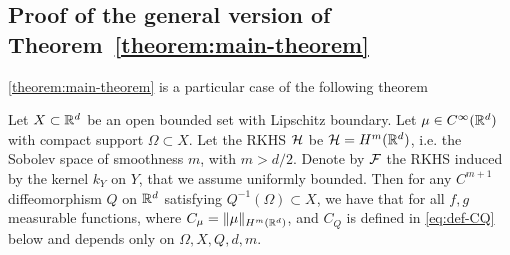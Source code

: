 \subsection{Proof of the general version of Theorem~\ref{theorem:main-theorem}}\label{sec:general-theorem}

\cref{theorem:main-theorem} is a particular case of the following theorem

\begin{theorem}\label{thm:general-theorem}
Let $X \subset \mathbb R^d$ be an open bounded set with Lipschitz boundary. Let $\mu \in C^\infty(\mathbb R^d)$ with compact support $\Omega \subset X$. Let the RKHS $\mathcal H$ be $\mathcal H = H^m(\mathbb R^d)$, i.e. the Sobolev space of smoothness $m$, with $m > d/2$. Denote by ${\cal F}$ the RKHS induced by the kernel $k_Y$ on $Y$, that we assume uniformly bounded. Then for any $C^{m+1}$ diffeomorphism $Q$ on $\mathbb R^d$ satisfying $Q^{-1}(\Omega) \subset X$, we have that for all $f, g$ measurable functions,
where $C_\mu = \|\mu\|_{H^m(\mathbb R^d)}$, and $C_Q$ is defined in \cref{eq:def-CQ} below and depends only on $\Omega, X, Q, d, m$.
\end{theorem}
